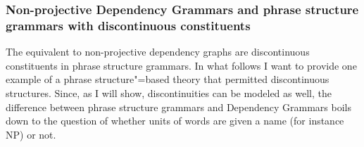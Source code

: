 \subsubsection{Non-projective Dependency Grammars and phrase structure grammars with discontinuous constituents}
\label{sec-discontinuous-constituents-HPSG}

The equivalent to non-projective dependency graphs are discontinuous constituents in phrase
structure grammars. In what follows I want to provide one
example of a phrase structure"=based theory that permitted discontinuous structures. Since, as I
will show, discontinuities can be modeled as well, the difference between phrase structure grammars
and Dependency Grammars boils down to the question of whether units of words are given a name (for
instance NP) or not.

